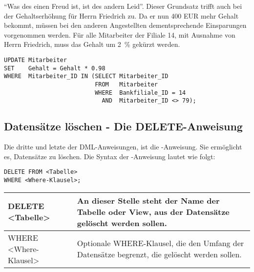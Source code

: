 \enquote{Was des einen Freud ist, ist des andern Leid}. Dieser
Grundsatz trifft auch bei der Gehaltserhöhung für Herrn Friedrich
zu. Da er nun 400 EUR mehr Gehalt bekommt, müssen bei den anderen
Angestellten dementsprechende Einsparungen vorgenommen  werden. Für
alle Mitarbeiter der Filiale 14, mit Ausnahme von Herrn Friedrich,
muss das Gehalt um 2~\% gekürzt werden.
\begin{lstlisting}[language=oracle_sql,caption={Gehaltskürzung für eine ganze Filiale},label=sql07_18]
UPDATE Mitarbeiter
SET    Gehalt = Gehalt * 0.98
WHERE  Mitarbeiter_ID IN (SELECT Mitarbeiter_ID
                          FROM   Mitarbeiter
                          WHERE  Bankfiliale_ID = 14
                            AND  Mitarbeiter_ID <> 79);
          \end{lstlisting}
\subsection{Datensätze löschen - Die DELETE-Anweisung}
Die dritte und letzte der DML-Anweisungen, ist die \DELETE-Anweisung.
Sie ermöglicht es, Datensätze zu löschen. Die Syntax der
\DELETE-Anweisung lautet wie folgt:
\begin{lstlisting}[language=oracle_sql,caption={Die \DELETE-Anweisung},label=sql07_19]
DELETE FROM <Tabelle>
WHERE <Where-Klausel>;
        \end{lstlisting}
\begin{center}
    \label{deletesyntax}
    \begin{small}
        \tabletail{
            \hline
        }
        \begin{supertabular}{|l|p{10.8cm}|}
            DELETE <Tabelle> & An dieser Stelle steht der Name der Tabelle
            oder View, aus der Datensätze gelöscht werden sollen. \\
            \hline
            WHERE <Where-Klausel> & Optionale WHERE-Klausel, die den Umfang
            der Datensätze begrenzt, die gelöscht werden sollen. \\
        \end{supertabular}
    \end{small}
\end{center}
